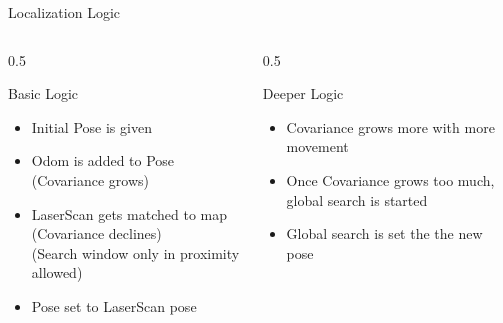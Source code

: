 \documentclass[aspectratio=169, 11pt]{beamer}
\begin{document}
\begin{frame}{Localization Logic}
  \begin{columns}[T]
    \begin{column}{0.5\textwidth}
      \begin{block}{Basic Logic}
          \begin{itemize}
            \item Initial Pose is given
            \item Odom is added to Pose (Covariance grows)
            \item LaserScan gets matched to map (Covariance declines)\\
                (Search window only in proximity allowed)
            \item Pose set to LaserScan pose
          \end{itemize}
      \end{block}
    \end{column}
    
    \begin{column}{0.5\textwidth}
      \begin{block}{Deeper Logic}
          \begin{itemize}
            \item Covariance grows more with more movement
            \item Once Covariance grows too much, global search is started
            \item Global search is set the the new pose
          \end{itemize}
      \end{block}
    \end{column}
  \end{columns}
\end{frame}
\end{document}
